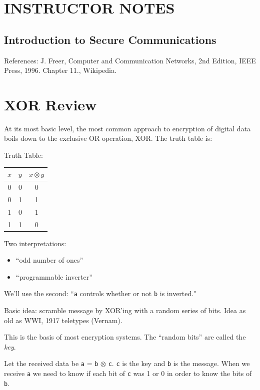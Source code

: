 \documentclass{article}	%
\begin{document}

\section*{INSTRUCTOR NOTES}	%


\begin{center}
    \section*{Introduction to Secure Communications}
\end{center}

References: J. Freer, Computer and Communication Networks, 2nd Edition,
IEEE Press, 1996.  Chapter 11.,  
Wikipedia.

\section{XOR Review}

At its most basic level, the most common approach to
encryption of digital data boils down to the exclusive OR operation,
XOR.    The truth table is:

\begin{center}
Truth Table:
\begin{tabular}{cc|c}
$x$  & $y$  &  $x \otimes y$ \\ \hline
0  & 0   &  0 \\
0  & 1   &  1 \\
1  & 0   &  1 \\
1  & 1   &  0 \\
\end{tabular}
\end{center}
 
  
Two interpretations:
\begin{itemize}
        \item ``odd number of ones''
        \item ``programmable inverter''
\end{itemize}
We'll use the second:   ``{\tt a} controls whether or not {\tt b} is inverted."

Basic idea:   scramble message by XOR'ing with a random series of
bits.  Idea as old as WWI, 1917 teletypes  (Vernam).

This is the basis of most encryption systems.  The ``random bits''
are called the {\it key}.

Let the received data be {\tt a} = {\tt b} $\otimes$ {\tt c}.
{\tt c} is the key and {\tt b} is the message.  When we receive {\tt a} we need to know if each bit of {\tt c} was
1 or 0 in order to know the bits of {\tt b}.
\end{document}
